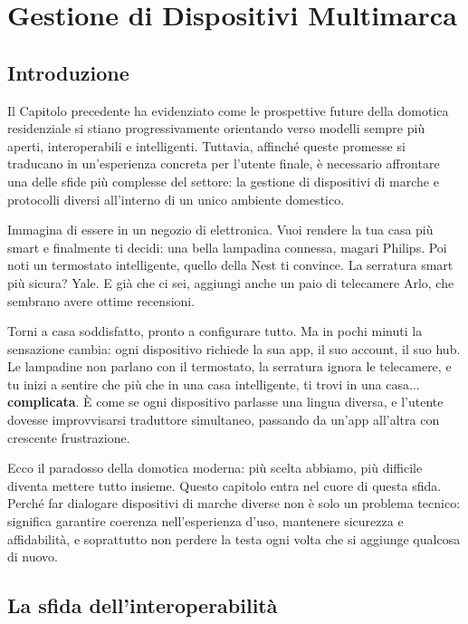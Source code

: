 
\chapter{Gestione di Dispositivi Multimarca}

\section{Introduzione}

Il Capitolo precedente ha evidenziato come le prospettive future della domotica residenziale si stiano progressivamente orientando verso modelli sempre più aperti, interoperabili e intelligenti. Tuttavia, affinché queste promesse si traducano in un'esperienza concreta per l'utente finale, è necessario affrontare una delle sfide più complesse del settore: la gestione di dispositivi di marche e protocolli diversi all'interno di un unico ambiente domestico.

Immagina di essere in un negozio di elettronica. Vuoi rendere la tua casa più smart e finalmente ti decidi: una bella lampadina connessa, magari Philips. Poi noti un termostato intelligente, quello della Nest ti convince. La serratura smart più sicura? Yale. E già che ci sei, aggiungi anche un paio di telecamere Arlo, che sembrano avere ottime recensioni.

Torni a casa soddisfatto, pronto a configurare tutto. Ma in pochi minuti la sensazione cambia: ogni dispositivo richiede la sua app, il suo account, il suo hub. Le lampadine non parlano con il termostato, la serratura ignora le telecamere, e tu inizi a sentire che più che in una casa intelligente, ti trovi in una casa... \textbf{complicata}. È come se ogni dispositivo parlasse una lingua diversa, e l'utente dovesse improvvisarsi traduttore simultaneo, passando da un'app all'altra con crescente frustrazione.

Ecco il paradosso della domotica moderna: più scelta abbiamo, più difficile diventa mettere tutto insieme. Questo capitolo entra nel cuore di questa sfida. Perché far dialogare dispositivi di marche diverse non è solo un problema tecnico: significa garantire coerenza nell’esperienza d’uso, mantenere sicurezza e affidabilità, e soprattutto non perdere la testa ogni volta che si aggiunge qualcosa di nuovo.

\section{La sfida dell'interoperabilità}

